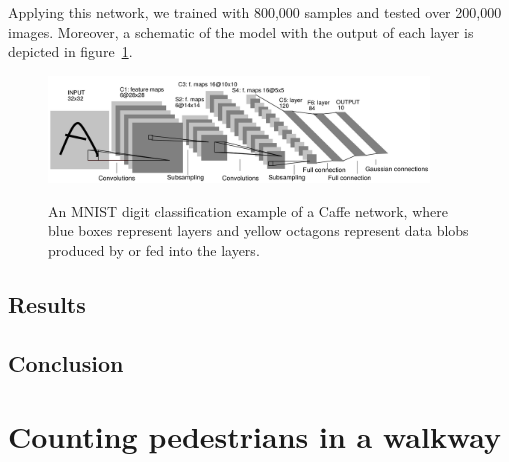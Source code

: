 Applying this network, we trained with 800,000 samples and tested over 200,000 images. 
Moreover, a schematic of the model with the output of each layer is depicted in figure~\ref{fig:digitnet}.










\begin{figure}[H]
	\centering
	{\includegraphics[width=0.9\textwidth]{images/digitnet}}
	\caption{An MNIST digit classification example of a Caffe network, where blue boxes represent layers and yellow octagons represent data blobs produced by or fed into the layers\cite{jia2014caffe}.}
	\label{fig:digitnet}
\end{figure}

\subsection{Results}
\subsection{Conclusion}

\section{Counting pedestrians in a walkway}